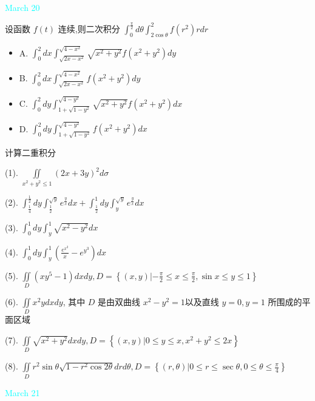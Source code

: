 \textcolor{cyan}{March 20}

\begin{example}[][Exam: 29.3.11]
	设函数 $f(t)$ 连续,则二次积分 $\int_{0}^{\frac{\pi}{2}}d\theta\int_{2\cos\theta}^{2}f(r^{2})rdr$
\begin{itemize}
	\item A. $\int_{0}^{2}dx\int_{\sqrt{2x-x^{2}}}^{\sqrt{4-x^{2}}}\sqrt{x^{2}+y^{2}}f(x^{2}+y^{2})dy$
	\item B. $\int_{0}^{2}dx\int_{\sqrt{2x-x^{2}}}^{\sqrt{4-x^{2}}}f(x^{2}+y^{2})dy$
	\item C. $\int_{0}^{2}dy\int_{1+\sqrt{1-y^{2}}}^{\sqrt{4-y^{2}}}\sqrt{x^{2}+y^{2}}f(x^{2}+y^{2})dx$
	\item D. $\int_{0}^{2}dy\int_{1+\sqrt{1-y^{2}}}^{\sqrt{4-y^{2}}}f(x^{2}+y^{2})dx$
\end{itemize}
\end{example}

\begin{example}[][Exam: 29.3.12]
	计算二重积分

(1). $\displaystyle{\iint\limits_{x^{2}+y^{2}\leq 1}(2x+3y)^{2}d\sigma}$

(2). $\displaystyle{\int_{\frac{1}{4}}^{\frac{1}{2}}dy\int_{\frac{1}{2}}^{\sqrt{y}}e^{\frac{y}{x}}dx+\int_{\frac{1}{2}}^{1}dy\int_{y}^{\sqrt{y}}e^{\frac{y}{x}}dx}$

(3). $\displaystyle{\int_{0}^{1}dy\int_{y}^{1}\sqrt{x^{2}-y^{2}}dx}$

(4). $\displaystyle{\int_{0}^{1}dy\int_{y}^{1}\left(\frac{e^{x^{2}}}{x}-e^{y^{3}}\right)dx}$

(5). $\displaystyle{\iint\limits_{D}\left(xy^{5}-1\right)dxdy,D=\left\{(x,y)|-\frac{\pi}{2}\leq x \leq \frac{\pi}{2},\sin x\leq y \leq 1 \right\}}$

(6). $\displaystyle{\iint\limits_{D}x^{2}ydxdy}$, 其中 $D$ 是由双曲线 $x^{2}-y^{2}=1$以及直线 $y=0,y=1$ 所围成的平面区域

(7). $\displaystyle{\iint\limits_{D}\sqrt{x^{2}+y^{2}}dxdy,D=\left\{(x,y)|0\leq y \leq x, x^{2}+y^{2}\leq 2x\right\}}$

(8). $\displaystyle{\iint\limits_{D}r^{2}\sin\theta\sqrt{1-r^{2}\cos 2\theta}drd\theta,D=\left\{(r,\theta)|0\leq r\leq \sec\theta,0\leq \theta \leq \frac{\pi}{4}\right\}}$
\end{example}

\textcolor{cyan}{March 21}

